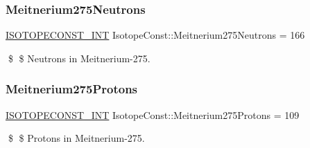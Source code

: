 \subsubsection{\texorpdfstring{Meitnerium275\+Neutrons}{Meitnerium275Neutrons}}
{\footnotesize\ttfamily \mbox{\hyperlink{group___isotope_const-_macros_ga5f18360b3e99483a35c32d789e62621c}{I\+S\+O\+T\+O\+P\+E\+C\+O\+N\+S\+T\+\_\+\+I\+NT}} Isotope\+Const\+::\+Meitnerium275\+Neutrons = 166}

\$ \$ Neutrons in Meitnerium-\/275. \mbox{\label{group___isotope_const-_meitnerium-_mt275_gab3334c054a2e5173d17176dd603e8c62}} 
\subsubsection{\texorpdfstring{Meitnerium275\+Protons}{Meitnerium275Protons}}
{\footnotesize\ttfamily \mbox{\hyperlink{group___isotope_const-_macros_ga5f18360b3e99483a35c32d789e62621c}{I\+S\+O\+T\+O\+P\+E\+C\+O\+N\+S\+T\+\_\+\+I\+NT}} Isotope\+Const\+::\+Meitnerium275\+Protons = 109}

\$ \$ Protons in Meitnerium-\/275. 